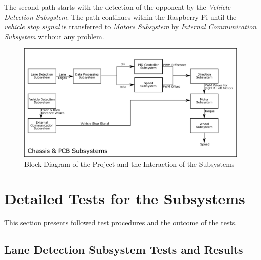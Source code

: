 \documentclass[a4paper,12pt]{article}
\begin{document}
	The second path starts with the detection of the opponent by the \textit{Vehicle Detection Subsystem}. The path continues within the Raspberry Pi until the \textit{vehicle stop signal} is transferred to \textit{Motors Subsystem} by \textit{Internal Communication Subsystem} without any problem.

	\begin{figure}[h]
		\includegraphics[width=\textwidth,center]{images/subsys_block.png}
		\caption{Block Diagram of the Project and the Interaction of the Subsystems}\label{fig:subsys-block}
	\end{figure}







\section{Detailed Tests for the Subsystems}\label{test_sec}
	This section presents followed test procedures and the outcome of the tests.

\subsection {Lane Detection Subsystem Tests and Results}	
\end{document}
